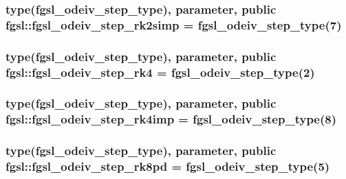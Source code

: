 \subsubsection[{fgsl\+\_\+odeiv\+\_\+step\+\_\+rk2simp}]{\setlength{\rightskip}{0pt plus 5cm}type({\bf fgsl\+\_\+odeiv\+\_\+step\+\_\+type}), parameter, public fgsl\+::fgsl\+\_\+odeiv\+\_\+step\+\_\+rk2simp = {\bf fgsl\+\_\+odeiv\+\_\+step\+\_\+type}(7)}\label{namespacefgsl_aba1fcb32d594f9bfa4e3d81e79ea8bff}
\hypertarget{namespacefgsl_a466a47d91e65ed8da5395e1e1cb53a2c}{}
\subsubsection[{fgsl\+\_\+odeiv\+\_\+step\+\_\+rk4}]{\setlength{\rightskip}{0pt plus 5cm}type({\bf fgsl\+\_\+odeiv\+\_\+step\+\_\+type}), parameter, public fgsl\+::fgsl\+\_\+odeiv\+\_\+step\+\_\+rk4 = {\bf fgsl\+\_\+odeiv\+\_\+step\+\_\+type}(2)}\label{namespacefgsl_a466a47d91e65ed8da5395e1e1cb53a2c}
\hypertarget{namespacefgsl_ac3387d8df1b6ef380e912fcb3a852d2b}{}
\subsubsection[{fgsl\+\_\+odeiv\+\_\+step\+\_\+rk4imp}]{\setlength{\rightskip}{0pt plus 5cm}type({\bf fgsl\+\_\+odeiv\+\_\+step\+\_\+type}), parameter, public fgsl\+::fgsl\+\_\+odeiv\+\_\+step\+\_\+rk4imp = {\bf fgsl\+\_\+odeiv\+\_\+step\+\_\+type}(8)}\label{namespacefgsl_ac3387d8df1b6ef380e912fcb3a852d2b}
\hypertarget{namespacefgsl_a104f6eb85d1676e32d4aa0a93531ef61}{}
\subsubsection[{fgsl\+\_\+odeiv\+\_\+step\+\_\+rk8pd}]{\setlength{\rightskip}{0pt plus 5cm}type({\bf fgsl\+\_\+odeiv\+\_\+step\+\_\+type}), parameter, public fgsl\+::fgsl\+\_\+odeiv\+\_\+step\+\_\+rk8pd = {\bf fgsl\+\_\+odeiv\+\_\+step\+\_\+type}(5)}\label{namespacefgsl_a104f6eb85d1676e32d4aa0a93531ef61}
\hypertarget{namespacefgsl_a0c2cde787f3c705f883a74b1be126952}{}
